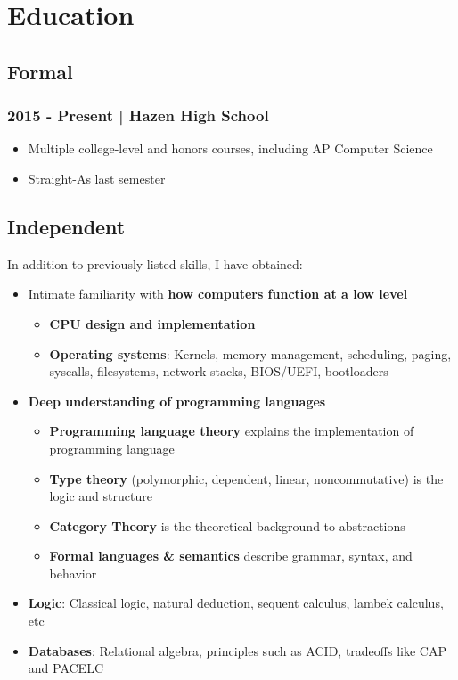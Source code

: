 \documentclass[11pt]{article}
\begin{document}
\section{Education}
\subsection{Formal}
\subsubsection{2015 - Present | Hazen High School}
\begin{itemize}[noitemsep,nolistsep]
\item Multiple college-level and honors courses, including AP Computer Science
\item Straight-As last semester
\end{itemize}

\subsection{Independent}
In addition to previously listed skills, I have obtained:
\begin{itemize}[noitemsep,nolistsep]
\item Intimate familiarity with {\bf how computers function at a low level}
  \begin{itemize}[noitemsep,nolistsep]
  \item {\bf CPU design and implementation}
  \item {\bf Operating systems}: Kernels, memory management, scheduling, paging, syscalls, filesystems, network stacks, BIOS/UEFI, bootloaders
  \end{itemize}
\item {\bf Deep understanding of programming languages}
  \begin{itemize}[noitemsep,nolistsep]
  \item {\bf Programming language theory} explains the implementation of programming language
  \item {\bf Type theory} (polymorphic, dependent, linear, noncommutative) is the logic and structure
  \item {\bf Category Theory} is the theoretical background to abstractions
  \item {\bf Formal languages \& semantics} describe grammar, syntax, and behavior
  \end{itemize}
\item {\bf Logic}: Classical logic, natural deduction, sequent calculus, lambek calculus, etc
\item {\bf Databases}: Relational algebra, principles such as ACID, tradeoffs like CAP and PACELC
\end{itemize}
\end{document}
